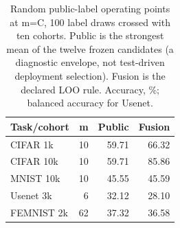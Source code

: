 \begin{table}[t]
\caption{Random public-label operating points at m=C, 100 label draws crossed with ten cohorts. Public is the strongest mean of the twelve frozen candidates (a diagnostic envelope, not test-driven deployment selection). Fusion is the declared LOO rule. Accuracy, \%; balanced accuracy for Usenet.}
\label{tab:budget-anchors}\small
\centering
\begin{tabular}{@{}lrrr@{}}\toprule
Task/cohort & m & Public & Fusion \\
\midrule
CIFAR 1k & 10 & 59.71 & 66.32 \\
CIFAR 10k & 10 & 59.71 & 85.86 \\
MNIST 10k & 10 & 45.55 & 45.59 \\
Usenet 3k & 6 & 32.12 & 28.10 \\
FEMNIST 2k & 62 & 37.32 & 36.58 \\
\bottomrule\end{tabular}
\end{table}
